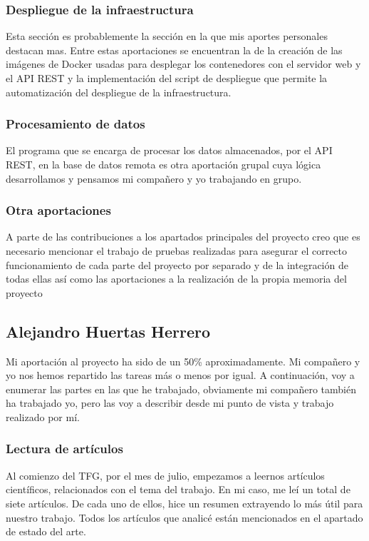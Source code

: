 \documentclass[11pt,spanish]{article}
\begin{document}
\subsubsection{Despliegue de la infraestructura}
Esta sección es probablemente la sección en la que mis aportes personales destacan mas. Entre estas aportaciones se encuentran la de la creación de las imágenes de Docker usadas para desplegar los contenedores con el servidor web y el API REST y la implementación del script de despliegue que permite la automatización del despliegue de la infraestructura.

\subsubsection{Procesamiento de datos}
El programa que se encarga de procesar los datos almacenados, por el API REST, en la base de datos remota es otra aportación grupal cuya lógica desarrollamos y pensamos mi compañero y yo trabajando en grupo.

\subsubsection{Otra aportaciones}
A parte de las contribuciones a los apartados principales del proyecto creo que es necesario mencionar el trabajo de pruebas realizadas para asegurar el correcto funcionamiento de cada parte del proyecto por separado y de la integración de todas ellas así como las aportaciones a la realización de la propia memoria del proyecto

\subsection{Alejandro Huertas Herrero}
Mi aportación al proyecto ha sido de un 50\% aproximadamente. Mi compañero y yo nos hemos repartido las tareas más o menos por igual. A continuación, voy a enumerar las partes en las que he trabajado, obviamente mi compañero también ha trabajado yo, pero las voy a describir desde mi punto de vista y trabajo realizado por mí.

\subsubsection{Lectura de artículos }
Al comienzo del TFG, por el mes de julio, empezamos a leernos artículos científicos, relacionados con el tema del trabajo. En mi caso, me leí un total de siete artículos. De cada uno de ellos, hice un resumen extrayendo lo más útil para nuestro trabajo. Todos los artículos que analicé están mencionados en el apartado de estado del arte.
\end{document}
